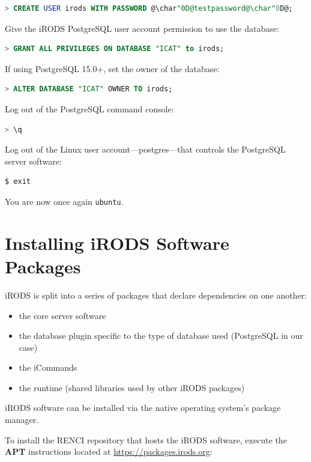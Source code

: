 \documentclass[10pt,oneside]{memoir}
\begin{document}
\begin{lstlisting}[language=sql]
> CREATE USER irods WITH PASSWORD @\char"0D@testpassword@\char"0D@;
\end{lstlisting}

Give the iRODS PostgreSQL user account permission to use the database:

\begin{lstlisting}[language=sql]
> GRANT ALL PRIVILEGES ON DATABASE "ICAT" to irods;
\end{lstlisting}

If using PostgreSQL 15.0+, set the owner of the database:

\begin{lstlisting}[language=sql]
> ALTER DATABASE "ICAT" OWNER TO irods;
\end{lstlisting}

Log out of the PostgreSQL command console:

\begin{lstlisting}[language=sql]
> \q
\end{lstlisting}

Log out of the Linux user account---postgres---that controls the PostgreSQL server software:

\begin{lstlisting}
$ exit
\end{lstlisting}

You are now once again \texttt{ubuntu}.

\section{Installing iRODS Software Packages}
iRODS is split into a series of packages that declare dependencies on one another:
\begin{itemize}
 \item the core server software
 \item the database plugin specific to the type of database used (PostgreSQL in our case)
 \item the iCommands
 \item the runtime (shared libraries used by other iRODS packages)
\end{itemize}

iRODS software can be installed via the native operating system's package manager.

\newpage
To install the RENCI repository that hosts the iRODS software, execute the \textbf{APT} instructions located at \url{https://packages.irods.org}:
\end{document}
